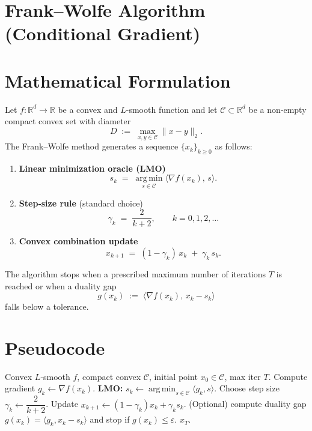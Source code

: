 \documentclass{article}
\newcommand{\argmin}{\operatorname*{arg\,min}}
\begin{document}
\section*{Frank--Wolfe Algorithm (Conditional Gradient)}

\section*{Mathematical Formulation}
Let $f:\mathbb{R}^d\to\mathbb{R}$ be a convex and $L$-smooth function and let $\mathcal{C}\subset\mathbb{R}^d$ be a non‑empty compact convex set with diameter 
\[
D \;:=\; \max_{x,y\in\mathcal{C}}\|x-y\|_2 .
\]
The Frank–Wolfe method generates a sequence $\{x_k\}_{k\ge 0}$ as follows:

\begin{enumerate}[label=\alph*)]
\item \textbf{Linear minimization oracle (LMO)}  
\[
s_k \;=\; \argmin_{s\in\mathcal{C}} \langle \nabla f(x_k),\, s\rangle .
\tag{1}
\]
\item \textbf{Step‑size rule} (standard choice)  
\[
\gamma_k \;=\; \frac{2}{k+2}, \qquad k=0,1,2,\dots
\tag{2}
\]
\item \textbf{Convex combination update}  
\[
x_{k+1} \;=\; (1-\gamma_k)\,x_k \;+\; \gamma_k\, s_k .
\tag{3}
\]
\end{enumerate}
The algorithm stops when a prescribed maximum number of iterations $T$ is reached or when a duality gap
\[
g(x_k) \;:=\; \langle \nabla f(x_k),\, x_k - s_k\rangle
\]
falls below a tolerance.

\section*{Pseudocode}
\begin{algorithm}[H]
\caption{Frank–Wolfe (Conditional Gradient)}\label{alg:FW}
\begin{algorithmic}[1]
\REQUIRE Convex $L$‑smooth $f$, compact convex $\mathcal{C}$, initial point $x_0\in\mathcal{C}$, max iter $T$.
    \STATE Compute gradient $g_k \gets \nabla f(x_k)$.
    \STATE \textbf{LMO:} $s_k \gets \argmin_{s\in\mathcal{C}} \langle g_k, s\rangle$.
    \STATE Choose step size $\gamma_k \gets \dfrac{2}{k+2}$.
    \STATE Update $x_{k+1} \gets (1-\gamma_k)x_k + \gamma_k s_k$.
    \STATE (Optional) compute duality gap $g(x_k)=\langle g_k, x_k-s_k\rangle$ and stop if $g(x_k)\le\varepsilon$.
\ENDFOR
\RETURN $x_T$.
\end{algorithmic}
\end{algorithm}
\end{document}
